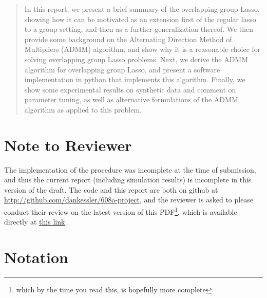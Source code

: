 \documentclass{article}
\begin{document}
\maketitle

\begin{abstract}
  In this report, we present a brief summary of the overlapping group Lasso, showing how it can be motivated as an extension first of the regular lasso to a group setting, and then as a further generalization thereof.
  We then provide some background on the Alternating Direction Method of Multipliers (ADMM) algorithm, and show why it is a reasonable choice for solving overlapping group Lasso problems.
  Next, we derive the ADMM algorithm for overlapping group Lasso, and present a software implementation in python that implements this algorithm.
  Finally, we show some experimental results on synthetic data and comment on parameter tuning, as well as alternative formulations of the ADMM algorithm as applied to this problem.
\end{abstract}

\section{Note to Reviewer}
\label{sec:note-reviewer}

The implementation of the procedure was incomplete at the time of submission, and thus the current report (including simulation results) is incomplete in this version of the draft.
The code and this report are both on github at \url{http://github.com/dankessler/608a-project}, and the reviewer is asked to please conduct their review on the latest version of this PDF\footnote{which by the time you read this, is hopefully more complete}, which is available directly at \href{https://github.com/dankessler/608a-project/blob/master/report/kesslerd-stats608a-project-report.pdf}{this link}.

\section{Notation}
\label{sec:notation}
\end{document}
